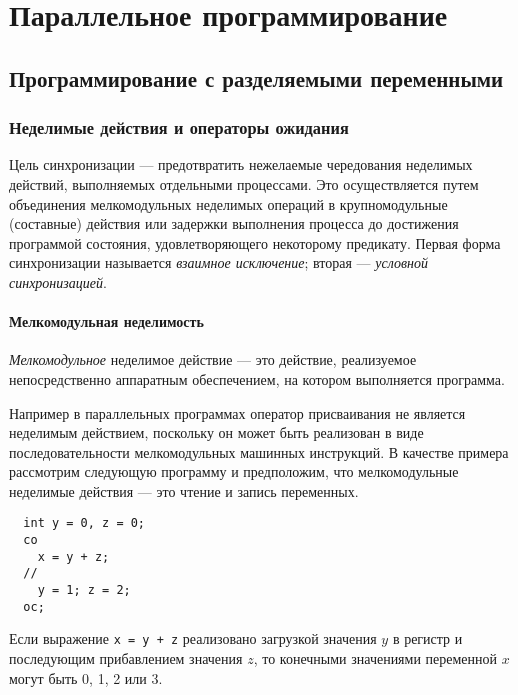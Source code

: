 \chapter{Параллельное программирование}
\label{ch:concurrent}

\lstset{language=,extendedchars=false,showspaces=true}





\section{Программирование с разделяемыми переменными}


\subsection{Неделимые действия и операторы ожидания}

Цель синхронизации --- предотвратить нежелаемые чередования неделимых действий,
выполняемых отдельными процессами. Это осуществляется путем объединения
мелкомодульных неделимых операций в крупномодульные (составные) действия или
задержки выполнения процесса до достижения программой состояния,
удовлетворяющего некоторому предикату. Первая форма синхронизации называется
\emph{взаимное исключение}; вторая --- \emph{условной синхронизацией}.


\subsubsection{Мелкомодульная неделимость}

\emph{Мелкомодульное} неделимое действие --- это действие, реализуемое
непосредственно аппаратным обеспечением, на котором выполняется программа.

Например в параллельных программах оператор присваивания не является неделимым
действием, поскольку он может быть реализован в виде последовательности
мелкомодульных машинных инструкций. В качестве примера рассмотрим следующую
программу и предположим, что мелкомодульные неделимые действия --- это чтение и
запись переменных.

\lstset{caption=}
\begin{lstlisting}
  int y = 0, z = 0;
  co
    x = y + z;
  //
    y = 1; z = 2;
  oc;
\end{lstlisting}

Если выражение \texttt{x = y + z} реализовано загрузкой значения $y$ в регистр и
последующим прибавлением значения $z$, то конечными значениями переменной $x$
могут быть 0, 1, 2 или 3.

